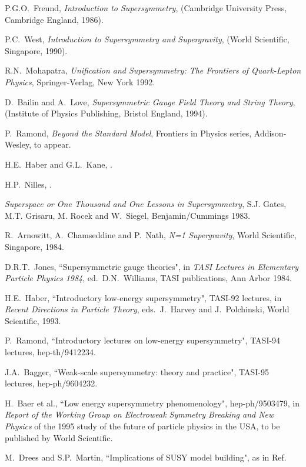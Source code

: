 \begin{thebibliography}{99}
P.G.O.~Freund, {\em Introduction to Supersymmetry},
(Cambridge University Press, Cambridge England, 1986).

 P.C.~West, {\em Introduction to Supersymmetry
and Supergravity}, (World Scientific, Singapore, 1990).

R.N.~Mohapatra,
{\em Unification and Supersymmetry: The Frontiers of
Quark-Lepton Physics}, Springer-Verlag, New York 1992.

 D.~Bailin and A.~Love,
{\em Supersymmetric Gauge Field Theory and String Theory},
(Institute of Physics Publishing, Bristol England, 1994).

 P.~Ramond, {\em Beyond the Standard Model},
Frontiers in Physics series, Addison-Wesley, to appear.

 H.E.~Haber and G.L.~Kane,
.

 H.P.~Nilles, .

{\em Superspace or One Thousand and One Lessons in Supersymmetry},
S.J.
Gates, M.T. Grisaru, M. Rocek and W.~Siegel,
Benjamin/Cummings 1983.

 R.~Arnowitt, A.~Chamseddine and P.~Nath,
{\em N=1 Supergravity}, World Scientific, Singapore, 1984.

 D.R.T.~Jones, ``Supersymmetric gauge theories",
in {\em TASI Lectures in Elementary Particle Physics 1984},
ed.~D.N.~Williams, TASI publications, Ann Arbor 1984.

 H.E.~Haber, ``Introductory low-energy
supersymmetry", TASI-92 lectures, in {\em
Recent Directions in Particle Theory},
eds.~J.~Harvey and J.~Polchinski, World Scientific, 1993.

 P.~Ramond, ``Introductory lectures on low-energy
supersymmetry", TASI-94 lectures, hep-th/9412234.

 J.A.~Bagger,
``Weak-scale supersymmetry: theory and practice",
 TASI-95 lectures,
hep-ph/9604232.

 H.~Baer et al.,
``Low energy supersymmetry phenomenology",
hep-ph/9503479, in {\em Report of the Working Group on Electroweak
Symmetry Breaking and New Physics} of the 1995 study of the future of
particle physics in the USA, to be published by World Scientific.

 M.~Drees and S.P.~Martin,
``Implications of SUSY model building", as in Ref.\cite{DPFpheno}


\end{thebibliography}
